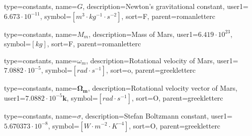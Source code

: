{
type=constants, %
name={\ensuremath{G}}, %
description={Newton's gravitational constant}, %
user1={$6.673\cdot10^{-11}$}, %
symbol={$\left[m^3\cdot kg^{-1} \cdot s^{-2}\right]$}, %
sort=F, %
parent=romanletterc %
}

{
type=constants, %
name={\ensuremath{M_{m}}}, %
description={Mass of Mars}, %
user1={$6.419\cdot10^{23}$}, %
symbol={$\left[kg\right]$}, %
sort=F, %
parent=romanletterc %
}

{
type=constants, %
name={\ensuremath{\omega_{m}}}, %
description={Rotational velocity of Mars}, %
user1={$7.0882\cdot10^{-5}$}, %
symbol={$\left[rad\cdot s^{-1}\right]$}, %
sort=o, %
parent=greekletterc %
}

{
type=constants, %
name={\ensuremath{\mathbf{\Omega_{m}}}}, %
description={Rotational velocity vector of Mars}, %
user1={$7.0882\cdot10^{-5}\mathbf{k}$}, %
symbol={$\left[rad\cdot s^{-1}\right]$}, %
sort=O, %
parent=greekletterc %
}

{
	type=constants, %
	name={\ensuremath{\sigma}}, %
	description={Stefan Boltzmann constant}, %
	user1={$5.670373\cdot10^{-8}$}, %
	symbol={$\left[W\cdot m^{-2}\cdot K^{-4}\right]$}, %
	sort=O, %
	parent=greekletterc %
}

